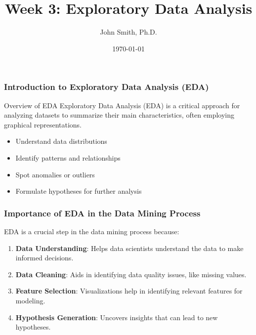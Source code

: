 \documentclass[aspectratio=169]{beamer}
\begin{document}
\frame{\titlepage}

\begin{frame}[fragile]
    \title{Week 3: Exploratory Data Analysis}
    \author{John Smith, Ph.D.}
    \date{\today}
    \maketitle
\end{frame}

\begin{frame}[fragile]
    \frametitle{Introduction to Exploratory Data Analysis (EDA)}
    
    \begin{block}{Overview of EDA}
        Exploratory Data Analysis (EDA) is a critical approach for analyzing datasets to summarize their main characteristics, often employing graphical representations.
    \end{block}
    
    \begin{itemize}
        \item Understand data distributions
        \item Identify patterns and relationships
        \item Spot anomalies or outliers
        \item Formulate hypotheses for further analysis
    \end{itemize}
\end{frame}

\begin{frame}[fragile]
    \frametitle{Importance of EDA in the Data Mining Process}
    
    EDA is a crucial step in the data mining process because:
    
    \begin{enumerate}
        \item \textbf{Data Understanding}: Helps data scientists understand the data to make informed decisions.
        \item \textbf{Data Cleaning}: Aids in identifying data quality issues, like missing values.
        \item \textbf{Feature Selection}: Visualizations help in identifying relevant features for modeling.
        \item \textbf{Hypothesis Generation}: Uncovers insights that can lead to new hypotheses.
    \end{enumerate}
\end{frame}
\end{document}
